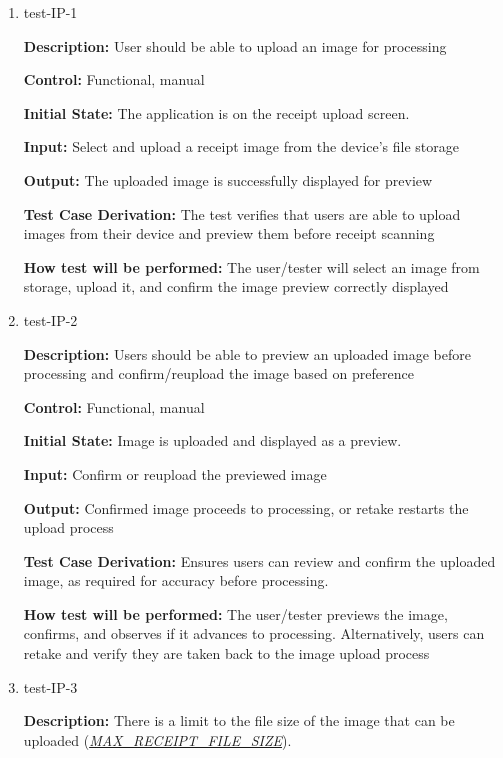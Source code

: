 \documentclass[12pt, titlepage]{article}
\begin{document}
\begin{enumerate}
\item{test-IP-1\\}

\textbf{Description:} User should be able to upload an image for processing

\textbf{Control:} Functional, manual

\textbf{Initial State:} The application is on the receipt upload screen.

\textbf{Input:} Select and upload a receipt image from the device's file storage

\textbf{Output:} The uploaded image is successfully displayed for preview

\textbf{Test Case Derivation:} The test verifies that users are able to upload images from their device and preview them before receipt scanning

\textbf{How test will be performed:} The user/tester will select an image from storage, upload it, and confirm the image preview correctly displayed

\item{test-IP-2\\}

\textbf{Description:} Users should be able to preview an uploaded image before processing and confirm/reupload the image based on preference

\textbf{Control:} Functional, manual

\textbf{Initial State:} Image is uploaded and displayed as a preview.

\textbf{Input:} Confirm or reupload the previewed image

\textbf{Output:} Confirmed image proceeds to processing, or retake restarts the upload process

\textbf{Test Case Derivation:} Ensures users can review and confirm the uploaded image, as required for accuracy before processing.

\textbf{How test will be performed:} The user/tester previews the image, confirms, and observes if it advances to processing. Alternatively, users can retake and verify they are taken back to the image upload process

\item{test-IP-3\\}

\textbf{Description:} There is a limit to the file size of the image that can be
uploaded
(\href{https://github.com/PlutosCapstone/Plutos/blob/main/docs/SRS/SRS.pdf}{\textit{MAX\_RECEIPT\_FILE\_SIZE}}).


\end{enumerate}
\end{document}
